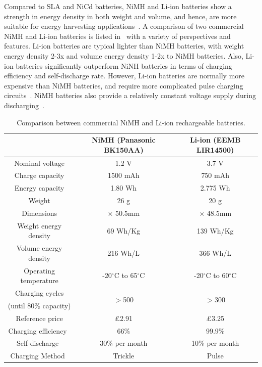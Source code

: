  Compared to SLA and NiCd batteries, NiMH and Li-ion batteries show a strength in energy density in both weight and volume, and hence, are more suitable for energy harvesting applications~\cite{raghunathan2005design, taneja2008design, akhtar2015energy, prauzek2018energy}. A comparison of two commercial NiMH and Li-ion batteries is listed in~ with a variety of perspectives and features. Li-ion batteries are typical lighter than NiMH batteries, with weight energy density 2-3x and volume energy density 1-2x to NiMH batteries. Also, Li-ion batteries significantly outperform NiNH batteries in terms of charging efficiency and self-discharge rate. However, Li-ion batteries are normally more expensive than NiMH batteries, and require more complicated pulse charging circuits~\cite{raghunathan2005design}. NiMH batteries also provide a relatively constant voltage supply during discharging~\cite{kansal2007power}. 

\begin{table}[!htb]
    \centering
    \begin{tabular}{ccc}
    \toprule
    & NiMH (Panasonic BK150AA) & Li-ion (EEMB LIR14500) \\
    \midrule
    Nominal voltage & 1.2 V & 3.7 V \\
    Charge capacity & 1500 mAh & 750 mAh \\
    Energy capacity & 1.80 Wh & 2.775 Wh \\
    Weight & 26 g & 20 g \\
    Dimensions & \diameter14.5mm $\times$ 50.5mm & \diameter14.1mm $\times$ 48.5mm \\
    Weight energy density & 69 Wh/Kg & 139 Wh/Kg \\
    Volume energy density & 216 Wh/L & 366 Wh/L \\
    Operating temperature & -20$^\circ$C to 65$^\circ$C & -20$^\circ$C to 60$^\circ$C \\
    Charging cycles & \multirow{2}{*}{$>$500} & \multirow{2}{*}{$>$300} \\
    (until 80\% capacity) & & \\
    Reference price & $\pounds$2.91 & $\pounds$3.25 \\
    Charging efficiency~\cite{prauzek2018energy} & 66\% & 99.9\% \\
    Self-discharge~\cite{prauzek2018energy} & 30\% per month & 10\% per month \\
    Charging Method~\cite{prauzek2018energy} & Trickle & Pulse \\
    \bottomrule
    \end{tabular}
    \caption{Comparison between commercial NiMH and Li-ion rechargeable batteries.}
    \label{Table:nimhliion}
\end{table}

